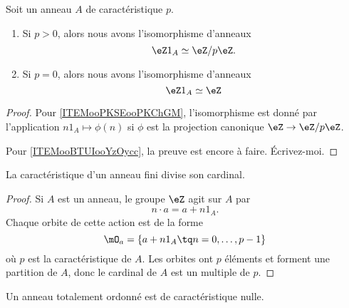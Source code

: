 \begin{lemma}       \label{LemHmDaYH}
	Soit un anneau \( A\) de caractéristique \( p\).
	\begin{enumerate}
		\item       \label{ITEMooPKSEooPKChGM}
		      Si \( p>0\), alors nous avons l'isomorphisme d'anneaux
		      \begin{equation}
			      \eZ 1_A\simeq\eZ/p\eZ.
		      \end{equation}
		\item        \label{ITEMooBTUIooYzOycc}
		      Si \( p=0\), alors nous avons l'isomorphisme d'anneaux
		      \begin{equation}
			      \eZ 1_A\simeq \eZ
		      \end{equation}
	\end{enumerate}
\end{lemma}

\begin{proof}
	Pour \ref{ITEMooPKSEooPKChGM}, l'isomorphisme est donné par l'application \( n1_A\mapsto \phi(n)\) si \( \phi\) est la projection canonique \( \eZ\to \eZ/p\eZ\).

	Pour \ref{ITEMooBTUIooYzOycc}, la preuve est encore à faire. Écrivez-moi.
\end{proof}

\begin{proposition}     \label{PropGExaUK}
	La caractéristique d'un anneau fini divise son cardinal.
\end{proposition}

\begin{proof}
	Si \( A\) est un anneau, le groupe \( \eZ\) agit sur \( A\) par
	\begin{equation}
		n\cdot a=a+n1_A.
	\end{equation}
	Chaque orbite de cette action est de la forme
	\begin{equation}
		\mO_a=\{ a+n1_A\tq n=0,\ldots, p-1 \}
	\end{equation}
	où \( p\) est la caractéristique de \( A\). Les orbites ont \( p\) éléments et forment une partition de \( A\), donc le cardinal de \( A\) est un multiple de \( p\).
\end{proof}

\begin{lemma}        \label{LEMooJQIKooQgukqn}
	Un anneau totalement ordonné est de caractéristique nulle.
\end{lemma}

